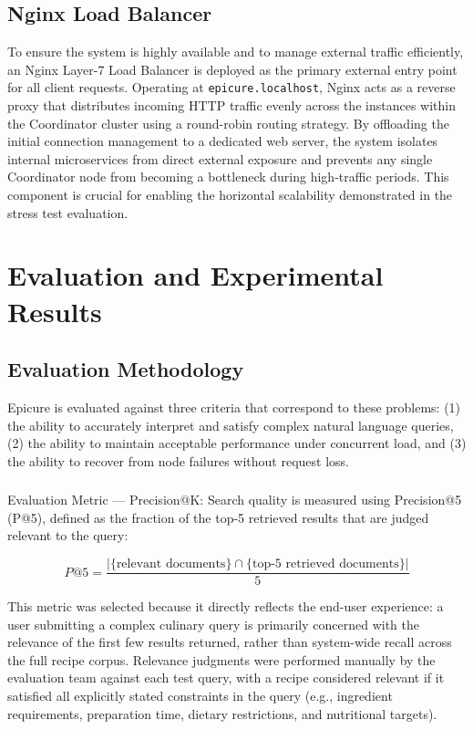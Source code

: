 \documentclass[conference]{IEEEtran}
\begin{document}
\subsection{Nginx Load Balancer}
\label{sec:nginx}
To ensure the system is highly available and to manage external traffic efficiently, an Nginx Layer-7 Load Balancer is deployed as the primary external entry point for all client requests. Operating at \texttt{epicure.localhost}, Nginx acts as a reverse proxy that distributes incoming HTTP traffic evenly across the instances within the Coordinator cluster using a round-robin routing strategy. By offloading the initial connection management to a dedicated web server, the system isolates internal microservices from direct external exposure and prevents any single Coordinator node from becoming a bottleneck during high-traffic periods. This component is crucial for enabling the horizontal scalability demonstrated in the stress test evaluation.

\section{Evaluation and Experimental Results}
\label{sec:evaluation}
\subsection{Evaluation Methodology}
Epicure is evaluated against three criteria that correspond to these problems: (1) the ability to accurately interpret and satisfy complex natural language queries, (2) the ability to maintain acceptable performance under concurrent load, and (3) the ability to recover from node failures without request loss.
\subsubsection{}{Evaluation Metric --- Precision@K:}
Search quality is measured using Precision@5 (P@5), defined as the fraction of the top-5 retrieved results that are judged relevant to the query:

\[
P@5 = \frac{|\{\text{relevant documents}\} \cap \{\text{top-5 retrieved documents}\}|}{5}
\]

This metric was selected because it directly reflects the end-user experience: a user submitting a complex culinary query is primarily concerned with the relevance of the first few results returned, rather than system-wide recall across the full recipe corpus. Relevance judgments were performed manually by the evaluation team against each test query, with a recipe considered relevant if it satisfied all explicitly stated constraints in the query (e.g., ingredient requirements, preparation time, dietary restrictions, and nutritional targets).
\end{document}

